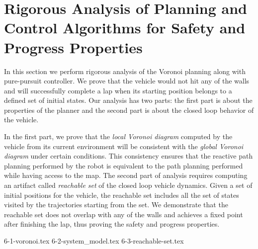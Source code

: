 \section{Rigorous Analysis of Planning and Control Algorithms for Safety and Progress Properties}
\label{sec:rigorous}

In this section we perform rigorous analysis of the Voronoi planning along with pure-pursuit controller.
%
We prove that the vehicle would not hit any of the walls and will successfully complete a lap when its starting position belongs to a defined set of initial states.
%
Our analysis has two parts: the first part is about the properties of the planner and the second part is about the closed loop behavior of the vehicle.
%

In the first part, we prove that the \emph{local Voronoi diagram} computed by the vehicle from its current environment will be consistent with the \emph{global Voronoi diagram} under certain conditions.
%
This consistency ensures that the reactive path planning performed by the robot is equivalent to the path planning performed while having access to the map.
%
The second part of analysis requires computing an artifact called \emph{reachable set} of the closed loop vehicle dynamics.
%
Given a set of initial positions for the vehicle, the reachable set includes all the set of states visited by the trajectories starting from the set.
%
We demonstrate that the reachable set does not overlap with any of the walls and achieves a fixed point after finishing the lap, thus proving the safety and progress properties.

{6-1-voronoi.tex}
{6-2-system_model.tex}
{6-3-reachable-set.tex}


